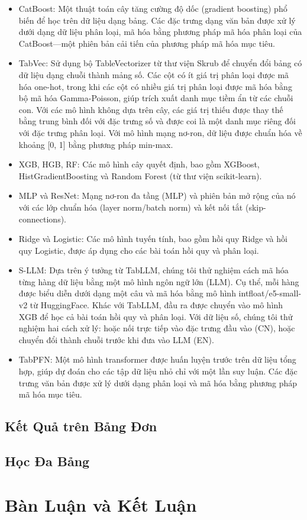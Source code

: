 \documentclass{article}
\begin{document}
\begin{itemize}
    \item CatBoost: Một thuật toán cây tăng cường độ dốc (gradient boosting) phổ biến để học trên dữ liệu dạng bảng. Các đặc trưng dạng văn bản được xử lý dưới dạng dữ liệu phân loại, mã hóa bằng phương pháp mã hóa phân loại của CatBoost—một phiên bản cải tiến của phương pháp mã hóa mục tiêu.
    \item TabVec: Sử dụng bộ TableVectorizer từ thư viện Skrub để chuyển đổi bảng có dữ liệu dạng chuỗi thành mảng số. Các cột có ít giá trị phân loại được mã hóa one-hot, trong khi các cột có nhiều giá trị phân loại được mã hóa bằng bộ mã hóa Gamma-Poisson, giúp trích xuất danh mục tiềm ẩn từ các chuỗi con. Với các mô hình không dựa trên cây, các giá trị thiếu được thay thế bằng trung bình đối với đặc trưng số và được coi là một danh mục riêng đối với đặc trưng phân loại. Với mô hình mạng nơ-ron, dữ liệu được chuẩn hóa về khoảng [0, 1] bằng phương pháp min-max.
    \item XGB, HGB, RF: Các mô hình cây quyết định, bao gồm XGBoost, HistGradientBoosting và Random Forest (từ thư viện scikit-learn).
    \item MLP và ResNet: Mạng nơ-ron đa tầng (MLP) và phiên bản mở rộng của nó với các lớp chuẩn hóa (layer norm/batch norm) và kết nối tắt (skip-connections).
    \item Ridge và Logistic: Các mô hình tuyến tính, bao gồm hồi quy Ridge và hồi quy Logistic, được áp dụng cho các bài toán hồi quy và phân loại.
    \item S-LLM: Dựa trên ý tưởng từ TabLLM, chúng tôi thử nghiệm cách mã hóa từng hàng dữ liệu bằng một mô hình ngôn ngữ lớn (LLM). Cụ thể, mỗi hàng được biểu diễn dưới dạng một câu và mã hóa bằng mô hình intfloat/e5-small-v2 từ HuggingFace. Khác với TabLLM, đầu ra được chuyển vào mô hình XGB để học cả bài toán hồi quy và phân loại. Với dữ liệu số, chúng tôi thử nghiệm hai cách xử lý: hoặc nối trực tiếp vào đặc trưng đầu vào (CN), hoặc chuyển đổi thành chuỗi trước khi đưa vào LLM (EN).
    \item TabPFN: Một mô hình transformer được huấn luyện trước trên dữ liệu tổng hợp, giúp dự đoán cho các tập dữ liệu nhỏ chỉ với một lần suy luận. Các đặc trưng văn bản được xử lý dưới dạng phân loại và mã hóa bằng phương pháp mã hóa mục tiêu.
\end{itemize}




\subsection{Kết Quả trên Bảng Đơn}

\subsection{Học Đa Bảng}

\section{Bàn Luận và Kết Luận}

\end{document}
